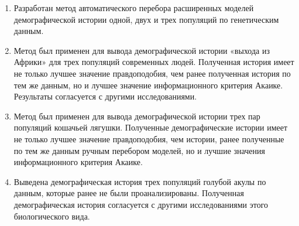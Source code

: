 \begin{enumerate}[label={\arabic*.}]
    \item Разработан метод автоматического перебора расширенных моделей демографической истории одной, двух и трех популяций по генетическим данным.
    \item Метод был применен для вывода демографической истории «выхода из Африки» для трех популяций современных людей. Полученная история имеет не только лучшее значение правдоподобия, чем ранее полученная история по тем же данным, но и лучшее значение информационного критерия Акаике. Результаты согласуется с другими исследованиями.
    \item Метод был применен для вывода демографической истории трех пар популяций кошачьей лягушки.
    Полученные демографические истории имеет не только лучшее значение правдоподобия, чем истории, ранее полученные по тем же данным ручным перебором моделей, но и лучшие значения информационного критерия Акаике.
    \item Выведена демографическая история трех популяций голубой акулы по данным, которые ранее не были проанализированы. Полученная демографическая история согласуется с другими исследованиями этого биологического вида.
\end{enumerate}
